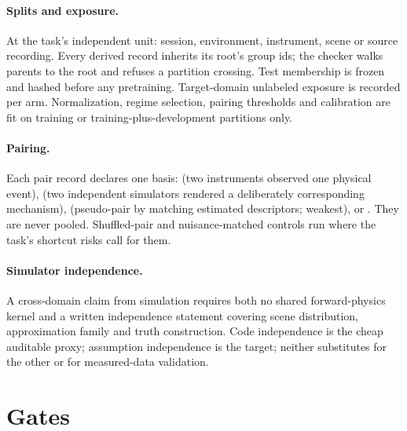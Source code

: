 \documentclass[11pt,a4paper]{article}
\begin{document}
\paragraph{Splits and exposure.} At the task's independent unit: session, environment, instrument, scene or source recording. Every derived record inherits its root's group ids; the checker walks parents to the root and refuses a partition crossing. Test membership is frozen and hashed before any pretraining. Target-domain unlabeled exposure is recorded per arm. Normalization, regime selection, pairing thresholds and calibration are fit on training or training-plus-development partitions only.

\paragraph{Pairing.} Each pair record declares one basis:  (two instruments observed one physical event),  (two independent simulators rendered a deliberately corresponding mechanism),  (pseudo-pair by matching estimated descriptors; weakest), or . They are never pooled. Shuffled-pair and nuisance-matched controls run where the task's shortcut risks call for them.

\paragraph{Simulator independence.} A cross-domain claim from simulation requires both no shared forward-physics kernel and a written independence statement covering scene distribution, approximation family and truth construction. Code independence is the cheap auditable proxy; assumption independence is the target; neither substitutes for the other or for measured-data validation.

\section{Gates}
\end{document}
